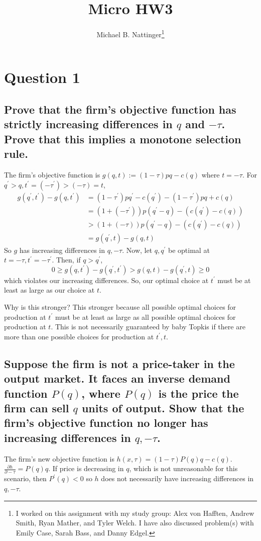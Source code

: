 \documentclass[11pt]{article} %
\title{Micro HW3}
\author{Michael B. Nattinger\footnote{I worked on this assignment with my study group: Alex von Hafften, Andrew Smith, Ryan Mather, and Tyler Welch. I have also discussed problem(s) with Emily Case, Sarah Bass, and Danny Edgel.}}
\begin{document}
\maketitle

\section{Question 1}
\subsection{Prove that the firm's objective function has strictly increasing differences in $q$ and $-\tau$. Prove that this implies a monotone selection rule.}
The firm's objective function is $g(q,t):= (1-\tau)pq - c(q)$ where $t = -\tau$. For $q^{'}>q,t^{'} = (-\tau^{'})>(-\tau) = t$,
\begin{align*}
g(q^{'},t^{'}) - g(q,t^{'}) &=  (1-\tau^{'})pq^{'} - c(q^{'}) - (1-\tau^{'})pq + c(q)\\
&=   (1+(-\tau^{'}))p(q^{'} - q) - (c(q^{'}) -c(q))\\
&> (1+(-\tau))p(q^{'} - q) - (c(q^{'}) -c(q))\\
&= g(q^{'},t) - g(q,t)
\end{align*}
So $g$ has increasing differences in $q,-\tau$. Now, let $q,q^{'}$ be optimal at $t = -\tau,t^{'} = -\tau^{'}$. Then, if $q>q^{'}$,
\begin{equation*}
0 \geq g(q,t^{'}) - g(q^{'},t^{'})> g(q,t) - g(q^{'},t) \geq 0
\end{equation*}
which violates our increasing differences. So, our optimal choice at $t^{'}$ must be at least as large as our choice at $t$.

Why is this stronger? This stronger because all possible optimal choices for production at $t^{'}$ must be at least as large as all possible optimal choices for production at $t$.  This is not necessarily guaranteed by baby Topkis if there are more than one possible choices for production at $t^{'},t$.
\subsection{Suppose the firm is not a price-taker in the output market. It faces an inverse demand function $P(q)$, where $P(q)$ is the price the firm can sell $q$ units of output. Show that the firm's objective function no longer has increasing differences in $q,-\tau$.}
The firm's new objective function is $h(x,\tau) = (1-\tau)P(q)q - c(q)$. $\frac{\partial h}{\partial -\tau} = P(q)q$. If price is decreasing in $q$, which is not unreasonable for this scenario, then $P^{'}(q)<0$ so $h$ does not necessarily have increasing differences in $q,-\tau$.
\end{document}
